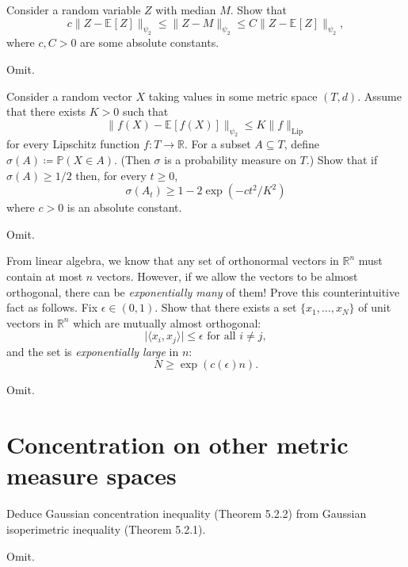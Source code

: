 \begin{problem*}[Exercise 5.1.13]\label{ex5.1.13}
	Consider a random variable \(Z\) with median \(M\). Show that
	\[
		c \lVert Z - \mathbb{E}_{}[Z] \rVert _{\psi _2}
		\leq \lVert Z - M \rVert _{\psi _2}
		\leq C \lVert Z - \mathbb{E}_{}[Z]  \rVert _{\psi _2},
	\]
	where \(c, C > 0\) are some absolute constants.
\end{problem*}
\begin{answer}
	Omit.
\end{answer}

\begin{problem*}[Exercise 5.1.14]\label{ex5.1.14}
	Consider a random vector \(X\) taking values in some metric space \((T, d)\). Assume that there exists \(K > 0\) such that
	\[
		\lVert f(X) - \mathbb{E}_{}[f(X)] \rVert _{\psi _2}
		\leq K \lVert f \rVert _{\mathrm{Lip} }
	\]
	for every Lipschitz function \(f \colon T \to \mathbb{R} \). For a subset \(A \subseteq T\), define \(\sigma (A) \coloneqq \mathbb{P} (X \in A)\). (Then \(\sigma \) is a probability measure on \(T\).) Show that if \(\sigma (A) \geq 1 / 2\) then, for every \(t \geq 0\),
	\[
		\sigma (A_t)
		\geq 1 - 2 \exp (-ct^2 / K^2)
	\]
	where \(c > 0\) is an absolute constant.
\end{problem*}
\begin{answer}
	Omit.
\end{answer}

\begin{problem*}[Exercise 5.1.15]\label{ex5.1.15}
	From linear algebra, we know that any set of orthonormal vectors in \(\mathbb{R} ^n\) must contain at most \(n\) vectors. However, if we allow the vectors to be almost orthogonal, there can be \emph{exponentially many} of them! Prove this counterintuitive fact as follows. Fix \(\epsilon \in (0, 1)\). Show that there exists a set \(\{ x_1, \dots , x_N \} \) of unit vectors in \(\mathbb{R} ^n\) which are mutually almost orthogonal:
	\[
		\lvert \langle x_i, x_j \rangle \rvert \leq \epsilon \text{ for all } i \neq j,
	\]
	and the set is \emph{exponentially large} in \(n\):
	\[
		N
		\geq \exp (c(\epsilon ) n).
	\]
\end{problem*}
\begin{answer}
	Omit.
\end{answer}

\section{Concentration on other metric measure spaces}
\begin{problem*}[Exercise 5.2.3]\label{ex5.2.3}
	Deduce Gaussian concentration inequality (Theorem 5.2.2) from Gaussian isoperimetric inequality (Theorem 5.2.1).
\end{problem*}
\begin{answer}
	Omit.
\end{answer}

